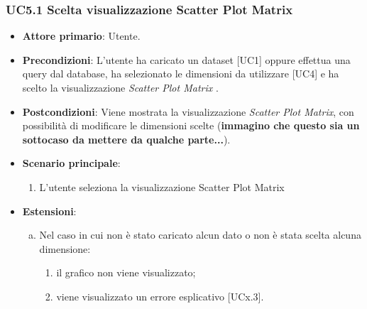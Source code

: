 \subsubsection{UC5.1 Scelta visualizzazione Scatter Plot Matrix}
\begin{figure}[h]
\centering
\caption{}
\end{figure}
\begin{itemize}
	\item \textbf{Attore primario}: Utente.
	\item \textbf{Precondizioni}: L'utente ha caricato un dataset [UC1] oppure effettua una query dal database, ha selezionato le dimensioni da utilizzare [UC4] e ha scelto la visualizzazione \textit{Scatter Plot Matrix} .
	\item \textbf{Postcondizioni}: Viene mostrata la visualizzazione \textit{Scatter Plot Matrix}, con possibilità di modificare le dimensioni scelte (\textbf{immagino che questo sia un sottocaso da mettere da qualche parte...}).
	\item \textbf{Scenario principale}:
		\begin{enumerate}
			\item L'utente seleziona la visualizzazione Scatter Plot Matrix
		\end{enumerate}
	\item \textbf{Estensioni}:
	\begin{enumerate}[(a)]
		\item Nel caso in cui non è stato caricato alcun dato o non è stata scelta alcuna dimensione:
		\begin{enumerate}[1.]
			\item il grafico non viene visualizzato;
			\item viene visualizzato un errore esplicativo [UCx.3].
		\end{enumerate}
	\end{enumerate}
\end{itemize}